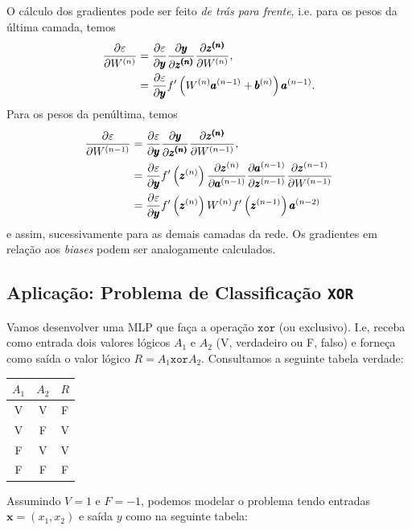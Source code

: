 O cálculo dos gradientes pode ser feito \emph{de trás para frente}, i.e. para os pesos da última camada, temos
\begin{align}
  \frac{\partial\varepsilon}{\partial W^{(n)}} &= \frac{\partial\varepsilon}{\partial\pmb{y}}\frac{\partial\pmb{y}}{\partial\pmb{z^{(n)}}}\frac{\partial\pmb{z^{(n)}}}{\partial W^{(n)}},\\
                             &= \frac{\partial\varepsilon}{\partial\pmb{y}}f'\left(W^{(n)}\pmb{a}^{(n-1)}+\pmb{b}^{(n)}\right)\pmb{a}^{(n-1)}.
\end{align}
Para os pesos da penúltima, temos
\begin{align}
  \frac{\partial\varepsilon}{\partial W^{(n-1)}} &= \frac{\partial\varepsilon}{\partial\pmb{y}}\frac{\partial\pmb{y}}{\partial\pmb{z^{(n)}}}\frac{\partial\pmb{z^{(n)}}}{\partial W^{(n-1)}},\\
                                     &= \frac{\partial\varepsilon}{\partial\pmb{y}}f'\left(\pmb{z}^{(n)}\right)\frac{\partial\pmb{z}^{(n)}}{\partial\pmb{a}^{(n-1)}}\frac{\partial\pmb{a}^{(n-1)}}{\partial\pmb{z}^{(n-1)}}\frac{\partial\pmb{z}^{(n-1)}}{\partial W^{(n-1)}}\\
                                     &= \frac{\partial\varepsilon}{\partial\pmb{y}}f'\left(\pmb{z}^{(n)}\right)W^{(n)}f'\left(\pmb{z}^{(n-1)}\right)\pmb{a}^{(n-2)}
\end{align}
e assim, sucessivamente para as demais camadas da rede. Os gradientes em relação aos \textit{biases} podem ser analogamente calculados.

\subsection{Aplicação: Problema de Classificação \texttt{XOR}}

Vamos desenvolver uma MLP que faça a operação $\texttt{xor}$ (ou exclusivo). I.e, receba como entrada dois valores lógicos $A_1$ e $A_2$ (V, verdadeiro ou F, falso) e forneça como saída o valor lógico $R = A_1 \texttt{xor} A_2$. Consultamos a seguinte tabela verdade:

\begin{center}
  \begin{tabular}{cc|c}
    $A_1$ & $A_2$ & $R$\\\hline
    V & V & F\\
    V & F & V\\
    F & V & V\\
    F & F & F\\\hline
  \end{tabular}
\end{center}

Assumindo $V = 1$ e $F = -1$, podemos modelar o problema tendo entradas $\pmb{x} = (x_1, x_2)$ e saída $y$ como na seguinte tabela:

